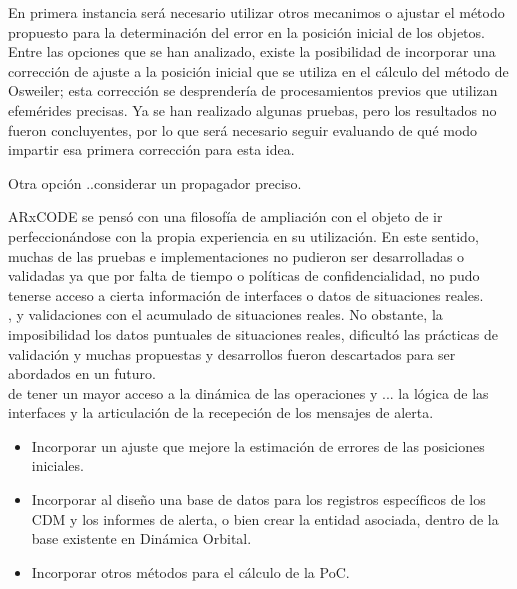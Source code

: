 En primera instancia ser\'a necesario utilizar otros mecanimos o ajustar el m\'etodo propuesto para la determinaci\'on del error en la posici\'on inicial de los objetos. Entre las opciones que se han analizado, existe la posibilidad de incorporar una correcci\'on de ajuste a la posici\'on inicial que se utiliza en el c\'alculo del m\'etodo de Osweiler; esta correcci\'on se desprender\'ia de procesamientos previos que utilizan efem\'erides precisas. Ya se han realizado algunas pruebas, pero los resultados no fueron concluyentes, por lo que ser\'a necesario seguir evaluando de qu\'e modo impartir esa primera correcci\'on para esta idea.

Otra opción ..considerar un propagador preciso.


ARxCODE se pens\'o con una filosof\'ia de ampliaci\'on con el objeto de ir perfeccion\'andose con la propia experiencia en su utilizaci\'on. En este sentido, muchas de las pruebas e implementaciones no pudieron ser desarrolladas o validadas ya que por falta de tiempo o pol\'iticas de confidencialidad, no pudo tenerse acceso a cierta informaci\'on de interfaces o datos de situaciones reales.\\

, y validaciones con el acumulado de situaciones reales. No obstante, la imposibilidad  los datos puntuales de situaciones reales, dificult\'o las pr\'acticas de validaci\'on y muchas propuestas y desarrollos fueron descartados para ser abordados en un futuro.\\

de tener un mayor acceso a la din\'amica de las operaciones y ... la l\'ogica de las interfaces y la articulaci\'on de la recepeci\'on de los mensajes de alerta. 

\begin{itemize}
 \item Incorporar un ajuste que mejore la estimaci\'on de errores de las posiciones iniciales. 
 \item Incorporar al dise\~no una base de datos para los registros espec\'ificos de los CDM y los informes de alerta, o bien 
 crear la entidad asociada, dentro de la base existente en Din\'amica Orbital.
 \item Incorporar otros m\'etodos para el c\'alculo de la PoC.
\end{itemize}


\endinput